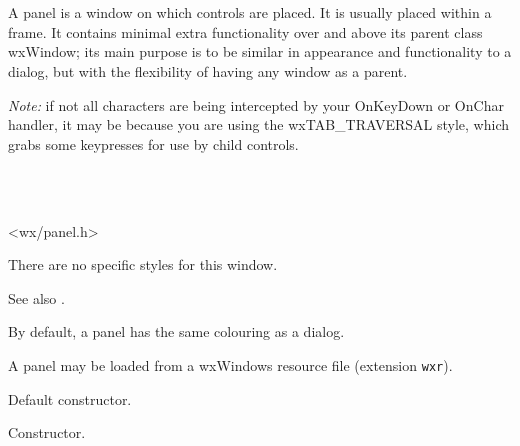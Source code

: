 \section{}\label{wxpanel}

A panel is a window on which controls are placed. It is usually placed within a frame.
It contains minimal extra functionality over and above its parent class wxWindow; its main
purpose is to be similar in appearance and functionality to a dialog, but with the flexibility of
having any window as a parent.

{\it Note:} if not all characters are being intercepted by your OnKeyDown or OnChar handler,
it may be because you are using the wxTAB\_TRAVERSAL style, which grabs some keypresses for use
by child controls.


\\
\\


<wx/panel.h>


There are no specific styles for this window.

See also .


By default, a panel has the same colouring as a dialog.

A panel may be loaded from a wxWindows resource file (extension {\tt wxr}).




\label{wxpanelconstr}


Default constructor.


Constructor.


